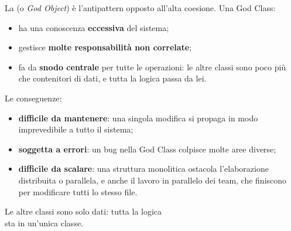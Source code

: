 La  (o \textit{God Object}) è l'antipattern opposto all'alta coesione. Una God Class:
\begin{itemize}
  \item ha una conoscenza \textbf{eccessiva} del sistema;
  \item gestisce \textbf{molte responsabilità non correlate};
  \item fa da \textbf{snodo centrale} per tutte le operazioni: le altre classi sono poco più che contenitori di dati, e
        tutta la logica passa da lei.
\end{itemize}

\noindent\begin{minipage}[c]{0.5\textwidth}
Le conseguenze:
\begin{itemize}
  \item \textbf{difficile da mantenere}: una singola modifica si propaga in modo imprevedibile a tutto il sistema;
  \item \textbf{soggetta a errori}: un bug nella God Class colpisce molte aree diverse;
  \item \textbf{difficile da scalare}: una struttura monolitica ostacola l'elaborazione distribuita o parallela, e
        anche il lavoro in parallelo dei team, che finiscono per modificare tutti lo stesso file.
\end{itemize}
\end{minipage}\hfill
\begin{minipage}[c]{0.46\textwidth}
\centering
{}

{\scriptsize Le altre classi sono solo dati: tutta la logica\\ sta in un'unica classe.\par}
\end{minipage}

